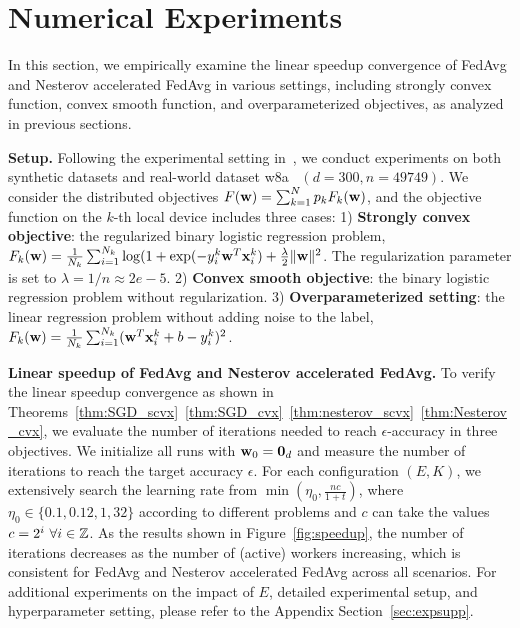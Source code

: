 


\section{Numerical Experiments}
\label{sec:exp}

In this section, we empirically examine the linear speedup convergence of FedAvg and Nesterov accelerated FedAvg in various settings, including strongly convex function, convex smooth function, and overparameterized objectives, as analyzed in previous sections.

\textbf{Setup.} Following the experimental setting in~\cite{stich2018local}, we
conduct experiments on both synthetic datasets and real-world dataset
w8a~\cite{platt1998fast} $(d=300, n=49749)$. We consider the distributed
objectives $F({\mathbf{w}}) = \sum_{k=1}^N p_kF_k({\mathbf{w}})$, and the objective function on the
$k$-th local device includes three cases: 1) \textbf{Strongly convex
objective}: the regularized binary logistic regression problem, $F_k({\mathbf{w}}) =
\frac{1}{N_k} \sum_{i=1}^{N_k} \log( 1+ \exp(-y_i^k {\mathbf{w}}^T{\mathbf{x}}_i^k) + \frac{\lambda}{2}
\|{\mathbf{w}}\|^2$. The regularization parameter is set to $\lambda = 1/n \approx
2e-5$. 2) \textbf{Convex smooth objective}: the binary logistic regression
problem without regularization. 3) \textbf{Overparameterized setting}:
the linear regression problem without adding noise to the label, $F_k({\mathbf{w}}) =
\frac{1}{N_k} \sum_{i=1}^{N_k} ({\mathbf{w}}^T{\mathbf{x}}_i^k + b  - y_i^k)^2$.  

\textbf{Linear speedup of FedAvg and Nesterov accelerated FedAvg.} To verify the linear speedup convergence as shown in Theorems~\ref{thm:SGD_scvx}~\ref{thm:SGD_cvx}~\ref{thm:nesterov_scvx}~\ref{thm:Nesterov_cvx}, we evaluate the number of iterations needed to reach
$\epsilon$-accuracy in three objectives. We initialize all runs with ${\mathbf{w}}_0 = \textbf{0}_d$ and measure the number of iterations to reach the target accuracy $\epsilon$. For each configuration $(E, K)$, we extensively search the learning rate from $\min(\eta_0, \frac{nc}{1 + t})$, where
$\eta_0 \in \{0.1, 0.12, 1, 32 \}$ according to different problems and $c$ can
take the values $c = 2^i \ \forall i \in \mathbb{Z}$. As the results shown in Figure~\ref{fig:speedup},
the number of iterations decreases as the number of (active) workers increasing, which is consistent for FedAvg and Nesterov accelerated FedAvg across all scenarios.
For additional experiments on the impact of $E$, detailed experimental setup, and hyperparameter setting, please refer to the Appendix Section~\ref{sec:expsupp}.

